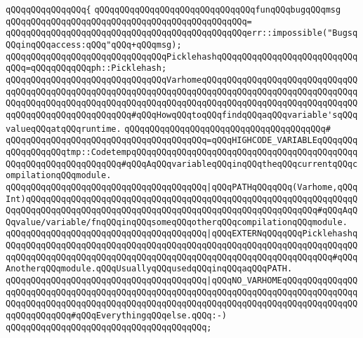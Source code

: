 \verb|qQQqqQQqqQQqqQQq{|\newline
\verb|qQQqqQQqqQQqqQQqqQQqqQQqqQQqqQQqfunqQQqbugqQQqmsg|\newline
\verb|qQQqqQQqqQQqqQQqqQQqqQQqqQQqqQQqqQQqqQQqqQQqqQQq=|\newline
\verb|qQQqqQQqqQQqqQQqqQQqqQQqqQQqqQQqqQQqqQQqqQQqqQQqerr::impossible("BugsqQQqinqQQqaccess:qQQq"qQQq+qQQqmsg);|\newline
\newline
\newline
\verb|qQQqqQQqqQQqqQQqqQQqqQQqqQQqqQQqPicklehashqQQqqQQqqQQqqQQqqQQqqQQqqQQqqQQq=qQQqqQQqqQQqph::Picklehash;|\newline
\newline
\newline
\verb|qQQqqQQqqQQqqQQqqQQqqQQqqQQqqQQqVarhomeqQQqqQQqqQQqqQQqqQQqqQQqqQQqqQQqqQQqqQQqqQQqqQQqqQQqqQQqqQQqqQQqqQQqqQQqqQQqqQQqqQQqqQQqqQQqqQQqqQQqqQQqqQQqqQQqqQQqqQQqqQQqqQQqqQQqqQQqqQQqqQQqqQQqqQQqqQQqqQQqqQQqqQQqqQQqqQQqqQQqqQQqqQQqqQQqqQQq#qQQqHowqQQqtoqQQqfindqQQqaqQQqvariable'sqQQqvalueqQQqatqQQqruntime.|\newline
\verb|qQQqqQQqqQQqqQQqqQQqqQQqqQQqqQQqqQQqqQQq#|\newline
\verb|qQQqqQQqqQQqqQQqqQQqqQQqqQQqqQQqqQQqqQQq=qQQqHIGHCODE_VARIABLEqQQqqQQqqQQqqQQqqQQqtmp::CodetempqQQqqQQqqQQqqQQqqQQqqQQqqQQqqQQqqQQqqQQqqQQqqQQqqQQqqQQqqQQqqQQqqQQq#qQQqAqQQqvariableqQQqinqQQqtheqQQqcurrentqQQqcompilationqQQqmodule.|\newline
\verb|qQQqqQQqqQQqqQQqqQQqqQQqqQQqqQQqqQQqqQQq|\verb#|qQQqPATHqQQqqQQq(Varhome,qQQqInt)qQQqqQQqqQQqqQQqqQQqqQQqqQQqqQQqqQQqqQQqqQQqqQQqqQQqqQQqqQQqqQQqqQQqqQQqqQQqqQQqqQQqqQQqqQQqqQQqqQQqqQQqqQQqqQQqqQQqqQQqqQQqqQQq#\verb|#qQQqAqQQqvalue/variable/fnqQQqinqQQqsomeqQQqotherqQQqcompilationqQQqmodule.|\newline
\verb|qQQqqQQqqQQqqQQqqQQqqQQqqQQqqQQqqQQqqQQq|\verb#|qQQqEXTERNqQQqqQQqPicklehashqQQqqQQqqQQqqQQqqQQqqQQqqQQqqQQqqQQqqQQqqQQqqQQqqQQqqQQqqQQqqQQqqQQqqQQqqQQqqQQqqQQqqQQqqQQqqQQqqQQqqQQqqQQqqQQqqQQqqQQqqQQqqQQqqQQqqQQq#\verb|#qQQqAnotherqQQqmodule.qQQqUsuallyqQQqusedqQQqinqQQqaqQQqPATH.|\newline
\verb|qQQqqQQqqQQqqQQqqQQqqQQqqQQqqQQqqQQqqQQq|\verb#|qQQqNO_VARHOMEqQQqqQQqqQQqqQQqqQQqqQQqqQQqqQQqqQQqqQQqqQQqqQQqqQQqqQQqqQQqqQQqqQQqqQQqqQQqqQQqqQQqqQQqqQQqqQQqqQQqqQQqqQQqqQQqqQQqqQQqqQQqqQQqqQQqqQQqqQQqqQQqqQQqqQQqqQQqqQQqqQQqqQQq#\verb|#qQQqEverythingqQQqelse.qQQq:-)|\newline
\verb|qQQqqQQqqQQqqQQqqQQqqQQqqQQqqQQqqQQqqQQq;|\newline
